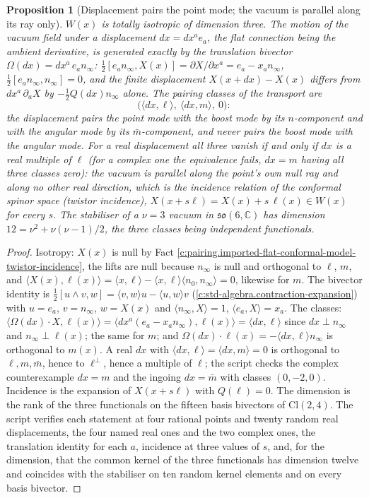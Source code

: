 \documentclass[11pt]{article}
\newtheorem{proposition}[theorem]{Proposition}
\theoremstyle{definition}
\theoremstyle{plain}
\providecommand{\C}{}\renewcommand{\C}{\mathbb{C}}
\providecommand{\Cl}{}\renewcommand{\Cl}{\mathrm{Cl}}
\providecommand{\mb}{}\renewcommand{\mb}{\bar m}
\providecommand{\ninf}{}\renewcommand{\ninf}{n_{\infty}}
\providecommand{\nz}{}\renewcommand{\nz}{n_{0}}
\providecommand{\so}{}\renewcommand{\so}{\mathfrak{so}}
\providecommand{\ip}{}\renewcommand{\ip}[2]{\langle #1, #2\rangle}
\begin{document}
\begin{proposition}[Displacement pairs the point mode; the vacuum is parallel along its ray only]\label{c:pairing.displacement-pairs-point-mode-vacuum-parallel}
$W(x)$ is totally isotropic of dimension three. The motion of the vacuum field under a displacement $dx = dx^{a}e_{a}$, the flat connection being the ambient derivative, is generated exactly by the translation bivector $\Omega(dx) = dx^{a}\,e_{a}\ninf$: $\tfrac12[e_{a}\ninf, X(x)] = \partial X/\partial x^{a} = e_{a} - x_{a}\ninf$, $\tfrac12[e_{a}\ninf, \ninf] = 0$, and the finite displacement $X(x + dx) - X(x)$ differs from $dx^{a}\,\partial_{a}X$ by $-\tfrac12 Q(dx)\ninf$ alone. The pairing classes of the transport are
\[
\bigl(\ip{dx}{\ell},\ \ip{dx}{m},\ 0\bigr):
\]
the displacement pairs the point mode with the boost mode by its $n$-component and with the angular mode by its $\mb$-component, and never pairs the boost mode with the angular mode. For a real displacement all three vanish if and only if $dx$ is a real multiple of $\ell$ (for a complex one the equivalence fails, $dx = m$ having all three classes zero): the vacuum is parallel along the point's own null ray and along no other real direction, which is the incidence relation of the conformal spinor space (twistor incidence), $X(x + s\ell) = X(x) + s\,\ell(x) \in W(x)$ for every $s$. The stabiliser of a $\nu = 3$ vacuum in $\so(6,\C)$ has dimension $12 = \nu^{2} + \nu(\nu-1)/2$, the three classes being independent functionals.
\end{proposition}
\begin{proof}
Isotropy: $X(x)$ is null by Fact \ref{c:pairing.imported-flat-conformal-model-twistor-incidence}, the lifts are null because $\ninf$ is null and orthogonal to $\ell$, $m$, and $\ip{X(x)}{\ell(x)} = \ip{x}{\ell} - \ip{x}{\ell}\ip{\nz}{\ninf} = 0$, likewise for $m$. The bivector identity is $\tfrac12[u\wedge v, w] = \ip{v}{w}u - \ip{u}{w}v$ (\ref{c:std-algebra.contraction-expansion}) with $u = e_{a}$, $v = \ninf$, $w = X(x)$ and $\ip{\ninf}{X} = 1$, $\ip{e_{a}}{X} = x_{a}$. The classes: $\ip{\Omega(dx)\cdot X}{\ell(x)} = \ip{dx^{a}(e_{a} - x_{a}\ninf)}{\ell(x)} = \ip{dx}{\ell}$ since $dx \perp \ninf$ and $\ninf \perp \ell(x)$; the same for $m$; and $\Omega(dx)\cdot\ell(x) = -\ip{dx}{\ell}\ninf$ is orthogonal to $m(x)$. A real $dx$ with $\ip{dx}{\ell} = \ip{dx}{m} = 0$ is orthogonal to $\ell, m, \mb$, hence to $\ell^{\perp}$, hence a multiple of $\ell$; the script checks the complex counterexample $dx = m$ and the ingoing $dx = \mb$ with classes $(0, -2, 0)$. Incidence is the expansion of $X(x + s\ell)$ with $Q(\ell) = 0$. The dimension is the rank of the three functionals on the fifteen basis bivectors of $\Cl(2,4)$. The script verifies each statement at four rational points and twenty random real displacements, the four named real ones and the two complex ones, the translation identity for each $a$, incidence at three values of $s$, and, for the dimension, that the common kernel of the three functionals has dimension twelve and coincides with the stabiliser on ten random kernel elements and on every basis bivector.

\end{proof}
\end{document}
